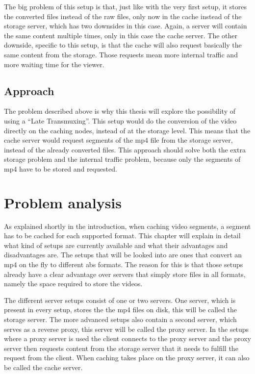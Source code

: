 \documentclass[twoside,openright]{uva-bachelor-thesis}
\begin{document}
The big problem of this setup is that, just like with the very first setup, it
stores the converted files instead of the raw files, only now in the cache
instead of the storage server, which has two downsides in this case. Again, a
server will contain the same content multiple times, only in this case the cache
server. The other downside, specific to this setup, is that the cache will also
request basically the same content from the storage. Those requests mean more
internal traffic and more waiting time for the viewer.

\section{Approach}
The problem described above is why this thesis will explore the possibility of
using a ``Late Transmuxing''. This setup would do the conversion of the video
directly on the caching nodes, instead of at the storage level. This means that
the cache server would request segments of the mp4 file from the storage server,
instead of the already converted files. This approach should solve both the
extra storage problem and the internal traffic problem, because only the segments
of mp4 have to be stored and requested.






\chapter{Problem analysis}
As explained shortly in the introduction, when caching video segments, a segment
has to be cached for each supported format. This chapter will explain in detail
what kind of setups are currently available and what their advantages and
disadvantages are. The setups that will be looked into are ones that convert an
mp4 on the fly to different \gls{abs} formats. The reason for this is that those
setups already have a clear advantage over servers that simply store files in
all formats, namely the space required to store the videos.

The different server setups consist of one or two servers. One server, which is
present in every setup, stores the the mp4 files on disk, this will be called
the storage server. The more advanced setups also contain a second server, which
serves as a reverse proxy, this server will be called the proxy server. In the
setups where a proxy server is used the client connects to the proxy server and
the proxy server then requests content from the storage server that it needs
to fulfill the request from the client. When caching takes place on the proxy
server, it can also be called the cache server.
\end{document}
